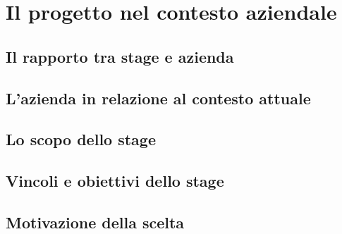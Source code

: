 
\chapter{Il progetto nel contesto aziendale}
\label{cap:progetto-contesto-aziendale}

\section{Il rapporto tra stage e azienda}


\section{L'azienda in relazione al contesto attuale}


\section{Lo scopo dello stage}


\section{Vincoli e obiettivi dello stage}


\section{Motivazione della scelta}

